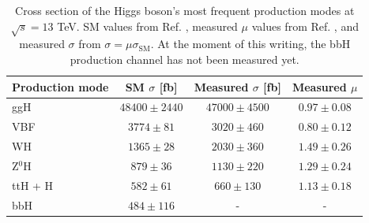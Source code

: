 \begin{table}[ht]
    \centering
    \begin{tabular}{|l|c|c|c|}
        \hline
        \multicolumn{1}{|c|}{\cellcolor{lightgray}Production mode} & \cellcolor{lightgray} SM $\sigma$ [fb] & \cellcolor{lightgray} Measured $\sigma$ [fb] & \cellcolor{lightgray} Measured $\mu$ \\ \hline
        ggH                         & $48400 \pm 2440$          & $47000 \pm 4500$          & $0.97 \pm 0.08$           \\
        VBF                         & $3774 \pm 81$             & $3020 \pm 460$            & $0.80 \pm 0.12$    \\
        WH                          & $1365  \pm 28$            & $2030  \pm 360$           & $1.49 \pm 0.26$     \\
        Z$^0$H                      & $879  \pm 36$             & $1130  \pm 220$           & $1.29 \pm 0.24$    \\
        ttH + H                     & $582  \pm 61$             & $660  \pm 130$             & $1.13 \pm 0.18$    \\
        bbH                         & $484  \pm 116$            & -       & - \\ \hline
    \end{tabular}
    \caption{Cross section of the Higgs boson's most frequent production modes at $\sqrt{s} = 13$ TeV. SM values from Ref. \cite{LHCHiggsCrossSectionWorkingGroup:2016ypw}, measured $\mu$ values from Ref. \cite{CMS:2022dwd}, and measured $\sigma$ from $\sigma=\mu\sigma_{\text{SM}}$. At the moment of this writing, the bbH production channel has not been measured yet.}
    \label{tab:Higgs_production}
\end{table}


